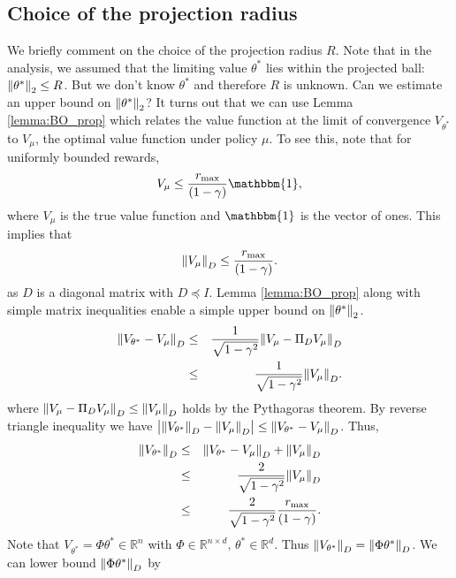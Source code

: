 \documentclass{colt2018} %
\begin{document}
\subsection{Choice of the projection radius} 
\label{sec:comment_projection}
We briefly comment on the choice of the projection radius $R$. Note that in the analysis, we assumed that the limiting value $\theta^*$ lies within the projected ball: $\norm{\theta^*}_2 \leq R$. But we don't know $\theta^*$ and therefore $R$ is unknown. Can we estimate an upper bound on $\norm{\theta^*}_2$? It turns out that we can use Lemma \ref{lemma:BO_prop} which relates the value function at the limit of convergence $V_{\theta^*}$ to $V_{\mu}$, the optimal value function under policy $\mu$. To see this, note that for uniformly bounded rewards, 
\begin{eqnarray*}
V_{\mu} \leq \frac{r_{\max}}{(1-\gamma)} \mathbbm{1},
\end{eqnarray*}
where $V_{\mu}$ is the true value function and $\mathbbm{1}$ is the vector of ones. This implies that
\begin{eqnarray*}
\norm{V_{\mu}}_D \leq \frac{r_{\max}}{(1-\gamma)}.
\end{eqnarray*}
as $D$ is a diagonal matrix with $D \preceq I$. Lemma \ref{lemma:BO_prop} along with simple matrix inequalities enable a simple upper bound on $\norm{\theta^*}_2$. 
\begin{eqnarray*}
\norm{V_{\theta^*} - V_{\mu} }_{D} &\leq& \frac{1}{\sqrt{1-\gamma^2}} \norm{V_{\mu} - \Pi_{D} V_{\mu}}_{D} \\
&\leq& \frac{1}{\sqrt{1-\gamma^2}} \norm{ V_{\mu}}_{D}.
\end{eqnarray*}
where $\norm{V_{\mu} - \Pi_{D} V_{\mu}}_{D} \leq \norm{ V_{\mu}}_{D}$ holds by the Pythagoras theorem. By reverse triangle inequality we have $\abs{ \norm{V_{\theta^*}}_D - \norm{V_{\mu}}_D } \leq \norm{V_{\theta^*} - V_{\mu} }_{D}$. Thus, 
\begin{eqnarray*}
\norm{V_{\theta^*}}_D  &\leq& \norm{V_{\theta^*} - V_{\mu} }_{D} + \norm{V_{\mu}}_D \\
&\leq& \frac{2}{\sqrt{1-\gamma^2}} \norm{ V_{\mu} }_{D} \\
&\leq& \frac{2}{\sqrt{1-\gamma^2}} \frac{r_{\max}}{(1-\gamma)}.
\end{eqnarray*}
Note that $V_{\theta^*} = \Phi \theta^* \in \mathbb{R}^n$ with $\Phi \in \mathbb{R}^{n \times d}, \, \theta^* \in \mathbb{R}^d$. Thus $\norm{V_{\theta^*}}_D = \norm{\Phi \theta^*}_D$. We can lower bound $\norm{\Phi \theta^*}_D$ by
\end{document}
